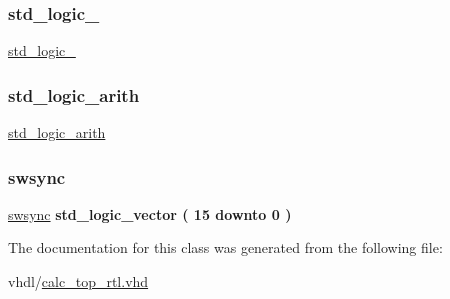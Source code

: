 \mbox{\label{classcalc__top_1_1struc_acd03516902501cd1c7296a98e22c6fcb}} 
\subsubsection{\texorpdfstring{std\+\_\+logic\+\_}{std\_logic\_1164}}
{\footnotesize\ttfamily \hyperlink{classcalc__top_1_1struc_acd03516902501cd1c7296a98e22c6fcb}{std\+\_\+logic\+\_}\hspace{0.3cm}{\ttfamily [Package]}}

\mbox{\label{classcalc__top_1_1struc_a0f5ecc6613f63d07f7963a97b1b26095}} 
\subsubsection{\texorpdfstring{std\+\_\+logic\+\_\+arith}{std\_logic\_arith}}
{\footnotesize\ttfamily \hyperlink{classcalc__top_1_1struc_a0f5ecc6613f63d07f7963a97b1b26095}{std\+\_\+logic\+\_\+arith}\hspace{0.3cm}{\ttfamily [Package]}}

\mbox{\label{classcalc__top_1_1struc_a9beb24b7dc36ee4c13f031555d2ceb3c}} 
\subsubsection{\texorpdfstring{swsync}{swsync}}
{\footnotesize\ttfamily \hyperlink{classcalc__top_1_1struc_a9beb24b7dc36ee4c13f031555d2ceb3c}{swsync} {\bfseries \textcolor{comment}{std\+\_\+logic\+\_\+vector}\textcolor{vhdlchar}{ }\textcolor{vhdlchar}{(}\textcolor{vhdlchar}{ }\textcolor{vhdlchar}{ } \textcolor{vhdldigit}{15} \textcolor{vhdlchar}{ }\textcolor{keywordflow}{downto}\textcolor{vhdlchar}{ }\textcolor{vhdlchar}{ } \textcolor{vhdldigit}{0} \textcolor{vhdlchar}{ }\textcolor{vhdlchar}{)}\textcolor{vhdlchar}{ }} \hspace{0.3cm}{\ttfamily [Signal]}}



The documentation for this class was generated from the following file\+:\begin{DoxyCompactItemize}
\item 
vhdl/\hyperlink{calc__top__rtl_8vhd}{calc\+\_\+top\+\_\+rtl.\+vhd}\end{DoxyCompactItemize}
